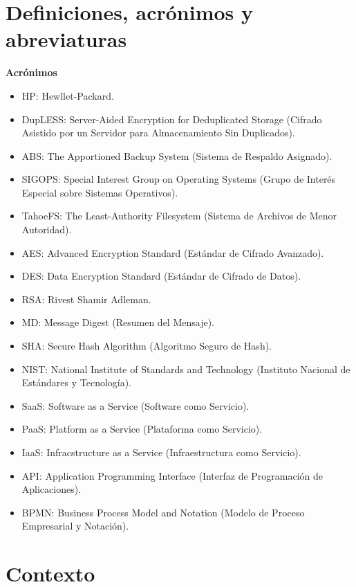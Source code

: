 \section{Definiciones, acrónimos y abreviaturas}

\textbf{Acrónimos}
\begin{itemize}
\item HP: Hewllet-Packard.
\item DupLESS: Server-Aided Encryption for Deduplicated Storage (Cifrado Asistido por un Servidor para Almacenamiento Sin Duplicados).
\item ABS: The Apportioned Backup System (Sistema de Respaldo Asignado).
\item SIGOPS: Special Interest Group on Operating Systems (Grupo de Interés Especial sobre Sistemas Operativos).
\item TahoeFS: The Least-Authority Filesystem (Sistema de Archivos de Menor Autoridad).
\item AES: Advanced Encryption Standard (Estándar de Cifrado Avanzado).
\item DES: Data Encryption Standard (Estándar de Cifrado de Datos).
\item RSA: Rivest Shamir Adleman.
\item MD: Message Digest (Resumen del Mensaje).
\item SHA: Secure Hash Algorithm (Algoritmo Seguro de Hash).
\item NIST: National Institute of Standards and Technology (Instituto Nacional de Estándares y Tecnología).
\item SaaS: Software as a Service (Software como Servicio).
\item PaaS: Platform as a Service (Plataforma como Servicio).
\item IaaS: Infracstructure as a Service (Infraestructura como Servicio).
\item API: Application Programming Interface (Interfaz de Programación de Aplicaciones).
\item BPMN: Business Process Model and Notation (Modelo de Proceso Empresarial y Notación). 
\end{itemize}

\section{Contexto}

